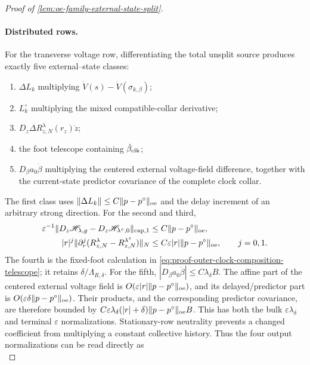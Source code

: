 \begin{proof}[Proof of
\cref{lem:oe-family-external-state-split}]
\paragraph{Distributed rows.}
For the transverse voltage row, differentiating the total unsplit source
produces exactly five external--state classes:
\begin{enumerate}[label=\textup{(\roman*)},leftmargin=2em]
\item \(\Delta L_k\) multiplying
      \(\dot V(s)-\dot V(\sigma_{k,\beta})\);
\item \(L_k^\circ\) multiplying the mixed compatible-collar derivative;
\item \(D_z\Delta R_{z,N}^{\lambda}(r_z)\dot z\);
\item the foot telescope containing \(\dot\beta_{\rm clk}\);
\item \(D_\beta a_0\dot\beta\) multiplying the centered external
      voltage-field difference, together with the current-state predictor
      covariance of the complete clock collar.
\end{enumerate}
The first class uses
\(\|\Delta L_k\|\le C\|p-p^\circ\|_{\rm oe}\) and the delay increment of
an arbitrary strong direction.  For the second and third,
\begin{align}
 \varepsilon^{-1}
 \|D_z\mathscr H_{\lambda,g}
       -D_z\mathscr H_{\lambda^\circ,0}\|_{\mathrm{cap},1}
 &\le C\|p-p^\circ\|_{\rm oe},\notag\\
 |r|^j\|\partial_r^j
       (R_{z,N}^{\lambda}-R_{z,N}^{\lambda^\circ})\|_N
 &\le C\varepsilon|r|\|p-p^\circ\|_{\rm oe},
 \qquad j=0,1.                                  \label{eq:proof-oe-family-mixed-collar-affine}
\end{align}
The fourth is the fixed-foot calculation in
\cref{eq:proof-outer-clock-composition-telescope}; it retains
\(\delta/\Lambda_{R,\delta}\).  For the fifth,
\(|D_\beta a_0\dot\beta|\le C\lambda_\delta B\).  The affine part of the
centered external voltage field is
\(O(\varepsilon|r|\|p-p^\circ\|_{\rm oe})\), and its delayed/predictor
part is \(O(\varepsilon\delta\|p-p^\circ\|_{\rm oe})\).  Their products,
and the corresponding predictor covariance, are therefore bounded by
\(C\varepsilon\lambda_\delta(|r|+\delta)
\|p-p^\circ\|_{\rm oe}B\).  This has both the bulk
\(\varepsilon\lambda_\delta\) and terminal \(\varepsilon\)
normalizations.  Stationary-row neutrality prevents a
changed coefficient from multiplying a constant collective history.
Thus the four output normalizations can be read directly as
\begin{equation}

\end{equation}
\end{proof}
